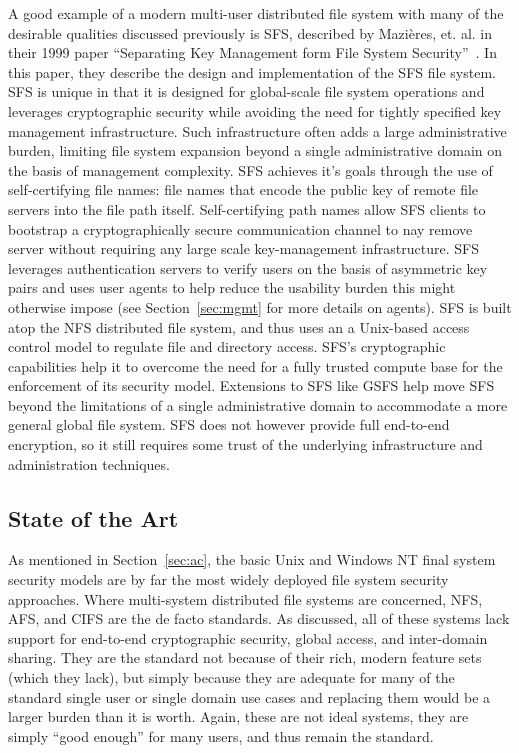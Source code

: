 \documentclass{sig-alternate}
\begin{document}
A good example of a modern multi-user distributed file system with
many of the desirable qualities discussed previously is SFS, described
by Mazi\`{e}res, et. al. in their 1999 paper ``Separating Key
Management form File System Security''~\cite{Mazieres1999}. In this
paper, they describe the design and implementation of the SFS file
system. SFS is unique in that it is designed for global-scale file
system operations and leverages cryptographic security while avoiding
the need for tightly specified key management infrastructure. Such
infrastructure often adds a large administrative burden, limiting file
system expansion beyond a single administrative domain on the basis of
management complexity. SFS achieves it's goals through the use of
self-certifying file names: file names that encode the public key of
remote file servers into the file path itself. Self-certifying path
names allow SFS clients to bootstrap a cryptographically secure
communication channel to nay remove server without requiring any large
scale key-management infrastructure. SFS leverages authentication
servers to verify users on the basis of asymmetric key pairs and uses
user agents to help reduce the usability burden this might otherwise
impose (see Section~\ref{sec:mgmt} for more details on agents). SFS is
built atop the NFS distributed file system, and thus uses an a
Unix-based access control model to regulate file and directory
access. SFS's cryptographic capabilities help it to overcome the need
for a fully trusted compute base for the enforcement of its security
model. Extensions to SFS like GSFS help move SFS beyond the
limitations of a single administrative domain to accommodate a more
general global file system. SFS does not however provide full
end-to-end encryption, so it still requires some trust of the
underlying infrastructure and administration techniques.

\subsection{State of the Art}

As mentioned in Section~\ref{sec:ac}, the basic Unix and Windows NT
final system security models are by far the most widely deployed file
system security approaches. Where multi-system distributed file
systems are concerned, NFS, AFS, and CIFS are the de facto
standards. As discussed, all of these systems lack support for
end-to-end cryptographic security, global access, and inter-domain
sharing. They are the standard not because of their rich, modern
feature sets (which they lack), but simply because they are adequate
for many of the standard single user or single domain use cases and
replacing them would be a larger burden than it is worth. Again, these
are not ideal systems, they are simply ``good enough'' for many users,
and thus remain the standard.
\end{document}
